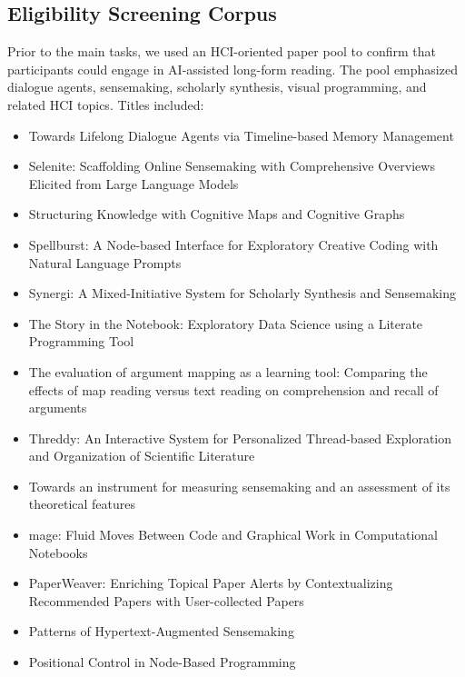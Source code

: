 \documentclass[manuscript,review,anonymous]{acmart}
\begin{document}
\subsection{Eligibility Screening Corpus}
Prior to the main tasks, we used an HCI-oriented paper pool to confirm that participants could engage in AI-assisted long-form reading. The pool emphasized dialogue agents, sensemaking, scholarly synthesis, visual programming, and related HCI topics. Titles included:
\begin{itemize}[leftmargin=*, noitemsep]
  \item Towards Lifelong Dialogue Agents via Timeline-based Memory Management~\cite{lifelong_dialogue_agents}
  \item Selenite: Scaffolding Online Sensemaking with Comprehensive Overviews Elicited from Large Language Models~\cite{selenite}
  \item Structuring Knowledge with Cognitive Maps and Cognitive Graphs~\cite{PEER202137}
  \item Spellburst: A Node-based Interface for Exploratory Creative Coding with Natural Language Prompts~\cite{spellburst}
  \item Synergi: A Mixed-Initiative System for Scholarly Synthesis and Sensemaking~\cite{Synergi}
  \item The Story in the Notebook: Exploratory Data Science using a Literate Programming Tool~\cite{story_in_notebook}
  \item The evaluation of argument mapping as a learning tool: Comparing the effects of map reading versus text reading on comprehension and recall of arguments~\cite{DWYER201016}
  \item Threddy: An Interactive System for Personalized Thread-based Exploration and Organization of Scientific Literature~\cite{threddy}
  \item Towards an instrument for measuring sensemaking and an assessment of its theoretical features~\cite{alsufiani_sensemaking_instrument}
  \item mage: Fluid Moves Between Code and Graphical Work in Computational Notebooks~\cite{mage}
  \item PaperWeaver: Enriching Topical Paper Alerts by Contextualizing Recommended Papers with User-collected Papers~\cite{paperweaver}
  \item Patterns of Hypertext-Augmented Sensemaking~\cite{hypertext_augmented_sensemaking}
  \item Positional Control in Node-Based Programming~\cite{positional_control}

\end{itemize}
\end{document}
